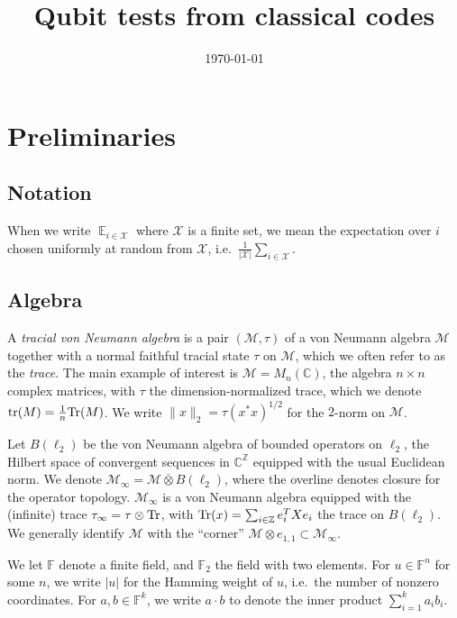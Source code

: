 \documentclass[11pt]{article}
\theoremstyle{definition}
\newcommand{\Tr}{\mbox{\rm Tr}}
\DeclareMathOperator*{\Expectation}{\mathbb{E}}
\newcommand{\Es}[1]{\Expectation_{#1}}
\newcommand{\field}{\mathbb{F}_2}
\newcommand{\C}{\ensuremath{\mathbb{C}}}
\newcommand{\F}{\ensuremath{\mathbb{F}}}
\newcommand{\Z}{\ensuremath{\mathbb{Z}}}
\newcommand{\mM}{\ensuremath{\mathcal{M}}}
\newcommand{\mX}{\ensuremath{\mathcal{X}}}
\DeclareMathOperator{\tr}{tr}
\begin{document}
\title{Qubit tests from classical codes}

\author{}
\date{\today}
\maketitle

\noteswarning


\begin{abstract}

\end{abstract}

	\section{Preliminaries}

\subsection{Notation}

When we write $\Es{i\in \mX}$ where $\mX$ is a finite set, we mean the expectation over $i$ chosen uniformly at random from $\mX$, i.e.\ $\frac{1}{|\mX|} \sum_{i\in \mX}$. 

\subsection{Algebra}

  A \emph{tracial von Neumann algebra} is a pair $(\mM,\tau)$ of a von Neumann algebra $\mM$ together with a normal faithful tracial state $\tau$ on $\mM$, which we often refer to as the \emph{trace}. The main example of interest is $\mM=M_n(\C)$, the algebra $n\times n$ complex matrices, with $\tau$ the dimension-normalized trace, which we denote $\tr(M)=\frac{1}{n}\Tr(M)$. 	We write $\|x\|_2=\tau(x^*x)^{1/2}$ for the $2$-norm on $\mM$.
	
	Let $B(\ell_2)$ be the von Neumann algebra of bounded operators on $\ell_2$, the Hilbert space of convergent sequences in $\C^\Z$ equipped with the usual Euclidean norm. We denote $\mM_\infty = \mM \overline{\otimes} B(\ell_2)$, where the overline denotes closure for the operator topology. $\mM_\infty$ is a von Neumann algebra equipped with the (infinite) trace $\tau_\infty = \tau \otimes \Tr$, with $\Tr(x)=\sum_{i\in \Z} e_i^T X e_i$ the trace on $B(\ell_2)$. We generally identify $\mM$ with the ``corner'' $\mM\otimes e_{1,1}\subset \mM_\infty$. 

	We let $\F$ denote a finite field, and $\field$ the field with two elements. For $u\in \F^n$ for some $n$, we write $|u|$ for the Hamming weight of $u$, i.e.\ the number of nonzero coordinates. For $a,b \in \F^k$, we write $a \cdot b$ to denote the inner product $\sum_{i=1}^k a_i b_i$. 
	
\end{document}
